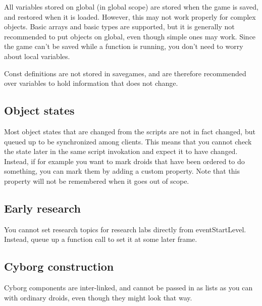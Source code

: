 \documentclass[12pt]{article}
\begin{document}
All variables stored on global (in global scope) are stored when the game is saved, and restored when it is 
loaded. However, this may not work properly for complex objects. Basic arrays and basic types are supported,
but it is generally not recommended to put objects on global, even though simple ones may work. Since the game
can't be saved while a function is running, you don't need to worry about local variables.

Const definitions are not stored in savegames, and are therefore recommended over variables to hold information 
that does not change.

\subsection{Object states}
Most object states that are changed from the scripts are not in fact changed, but queued up to be synchronized
among clients. This means that you cannot check the state later in the same script invokation and expect it to
have changed. Instead, if for example you want to mark droids that have been ordered to do something, you can
mark them by adding a custom property. Note that this property will not be remembered when it goes out of scope.

\subsection{Early research}
You cannot set research topics for research labs directly from eventStartLevel. Instead, queue up a function
call to set it at some later frame.

\subsection{Cyborg construction}
Cyborg components are inter-linked, and cannot be passed in as lists as you can with ordinary droids, even
though they might look that way.
\end{document}
